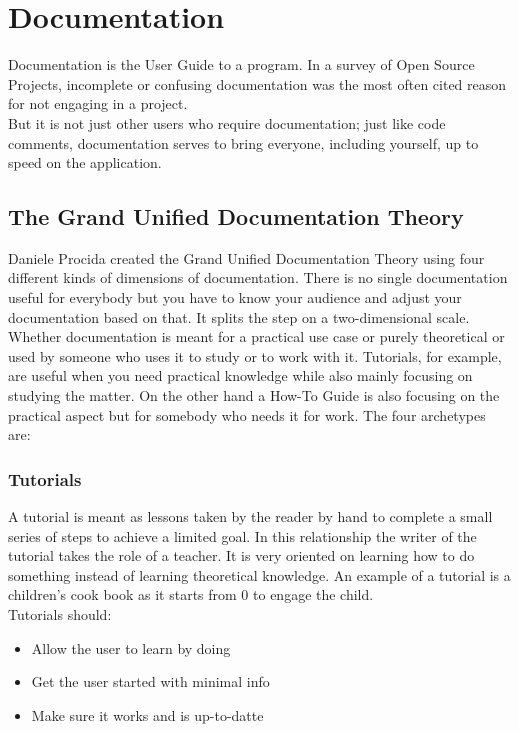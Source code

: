 \documentclass{article}
\begin{document}
	\section{Documentation}
	Documentation is the User Guide to a program. In a survey of Open Source Projects, incomplete or confusing documentation was the most often cited reason for not engaging in a project. \\
	But it is not just other users who require documentation; just like code comments, documentation serves to bring everyone, including yourself, up to speed on the application.
	\subsection{The Grand Unified Documentation Theory}
	Daniele Procida created the Grand Unified Documentation Theory using four different kinds of dimensions of documentation. There is no single documentation useful for everybody but you have to know your audience and adjust your documentation based on that. It splits the step on a two-dimensional scale. Whether documentation is meant for a practical use case or purely theoretical or used by someone who uses it to study or to work with it. Tutorials, for example, are useful when you need practical knowledge while also mainly focusing on studying the matter. On the other hand a How-To Guide is also focusing on the practical aspect but for somebody who needs it for work. The four archetypes are:
	\subsubsection{Tutorials}
	A tutorial is meant as lessons taken by the reader by hand to complete a small series of steps to achieve a limited goal. In this relationship the writer of the tutorial takes the role of a teacher. It is very oriented on learning how to do something instead of learning theoretical knowledge. An example of a tutorial is a children's cook book as it starts from 0 to engage the child. \\
	Tutorials should:
	\begin{itemize}
		\item{Allow the user to learn by doing}
		\item{Get the user started with minimal info}
		\item{Make sure it works and is up-to-datte}
	\end{itemize}
\end{document}

